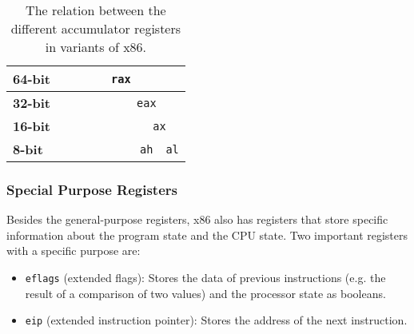 \begin{table}[ht]
    \centering
    \begin{tabular}{|l|llllllll|}
        \hline
        \textbf{64-bit} & \multicolumn{8}{c|}{\texttt{rax}} \\ \hline
        \textbf{32-bit} & & & & \multicolumn{1}{l|}{} & \multicolumn{4}{c|}{\texttt{eax}} \\ \hline
        \textbf{16-bit} & & & & & & \multicolumn{1}{l|}{} & \multicolumn{2}{c|}{\texttt{ax}} \\ \hline
        \textbf{8-bit} & & & & & & \multicolumn{1}{l|}{} & \multicolumn{1}{l|}{\texttt{ah}} & \texttt{al} \\ \hline
    \end{tabular}
    \caption{The relation between the different accumulator registers in variants of x86.}
    \label{table:registers}
\end{table}

\subsubsection{Special Purpose Registers}
Besides the general-purpose registers, x86 also has registers that store specific information about the program state and the CPU state. Two important registers with a specific purpose are:
\begin{itemize}
    \item \texttt{eflags} (extended flags): Stores the data of previous instructions (e.g. the result of a comparison of two values) and the processor state as booleans.
    \item \texttt{eip} (extended instruction pointer): Stores the address of the next instruction.
\end{itemize}

